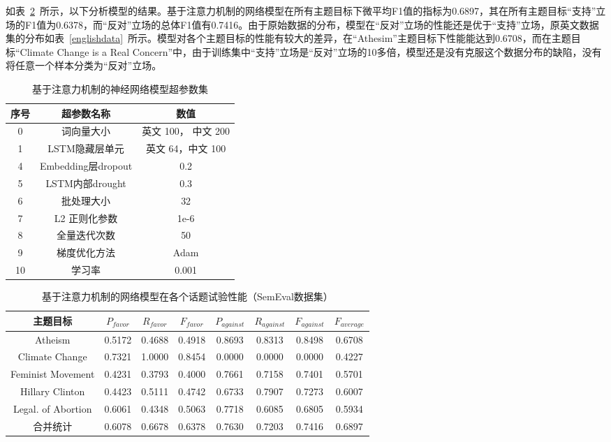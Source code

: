 如表~\ref{a_bi_gru_cnn_semeval}~所示，以下分析模型的结果。基于注意力机制的网络模型在所有主题目标下微平均F1值的指标为0.6897，其在所有主题目标“支持”立场的F1值为0.6378，而“反对”立场的总体F1值有0.7416。由于原始数据的分布，模型在“反对”立场的性能还是优于“支持”立场，原英文数据集的分布如表~\ref{englishdata}~所示。模型对各个主题目标的性能有较大的差异，在“Athesim”主题目标下性能能达到0.6708，而在主题目标“Climate Change is a Real Concern”中，由于训练集中“支持”立场是“反对”立场的10多倍，模型还是没有克服这个数据分布的缺陷，没有将任意一个样本分类为“反对”立场。
\begin{table}[htbp]
	\caption[param]{基于注意力机制的神经网络模型超参数集}
	\label{param1}
	\vspace{0.5em}\centering\wuhao
	\begin{tabular}{ccc}
		\toprule[1.5pt]
		序号& 超参数名称 &数值\\
		\midrule[1pt]
		0 &词向量大小& 英文 100， 中文 200\\
		1 &LSTM隐藏层单元& 英文 64，中文 100\\
		4 &Embedding层dropout& 0.2\\
		5 &LSTM内部drought& 0.3\\
		6 &批处理大小& 32\\
		7 &L2 正则化参数 &1e-6\\
		8 &全量迭代次数& 50\\
		9 &梯度优化方法& Adam\\
		10 &学习率& 0.001\\
		\bottomrule[1.5pt]
	\end{tabular}
\end{table}
\begin{table}[htbp]
	\caption[table123]{基于注意力机制的网络模型在各个话题试验性能（SemEval数据集）}
	\label{a_bi_gru_cnn_semeval}
	\vspace{0.5em}\centering\wuhao
	\begin{tabular}{cccccccc}
		\toprule[1.5pt]
		主题目标& $P_{favor}$&$R_{favor}$&$F_{favor}$&$P_{against}$&$R_{against}$&$F_{against}$&$F_{average}$ \\
		\midrule[1pt]
		Atheism&0.5172&0.4688&0.4918&0.8693&0.8313&0.8498&0.6708\\
		Climate Change&0.7321&1.0000&0.8454&0.0000&0.0000&0.0000&0.4227\\
		Feminist Movement&0.4231&0.3793&0.4000&0.7661&0.7158&0.7401&0.5701\\
		Hillary Clinton&0.4423&0.5111&0.4742&0.6733&0.7907&0.7273&0.6007\\
		Legal. of Abortion&0.6061&0.4348&0.5063&0.7718&0.6085&0.6805&0.5934\\
		合并统计&0.6078&0.6678&0.6378&0.7630&0.7203&0.7416&0.6897\\
		\bottomrule[1.5pt]
	\end{tabular}
\end{table}

